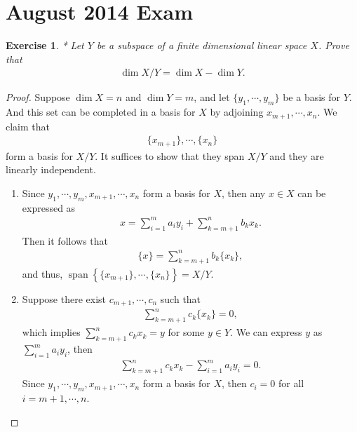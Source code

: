 \documentclass[11pt]{article}
\newtheorem{exercise}{Exercise}[section]
\theoremstyle{definition}
\numberwithin{equation}{subsection}
\begin{document}
\newpage
\section{August 2014 Exam}

\begin{exercise}{\rm \cite{10}*}
Let $Y$ be a subspace of a finite dimensional linear space $X$. Prove that
\begin{align*}
    \dim X/Y = \dim X - \dim Y.
\end{align*}
\end{exercise}
\begin{proof}
Suppose $\dim X = n$ and $\dim Y = m$, and let $\{y_1, \cdots, y_m\}$ be a basis for $Y$. And this set can be completed in a basis for $X$ by adjoining $x_{m+1}, \cdots, x_n$. We claim that
\begin{align*}
    \{x_{m+1}\}, \cdots, \{x_n\}
\end{align*}
form a basis for $X/Y$. It suffices to show that they span $X/Y$ and they are linearly independent.
\begin{enumerate}[label=(\alph*)]
    \item Since $y_1, \cdots, y_m, x_{m+1}, \cdots, x_n$ form a basis for $X$, then any $x \in X$ can be expressed as
    \begin{align*}
        x = \sum^m_{i=1} a_i y_i + \sum^n_{k=m+1} b_k x_k.
    \end{align*}
    Then it follows that
    \begin{align*}
        \{x\} = \sum^n_{k=m+1} b_k \{x_k\},
    \end{align*}
    and thus, $\operatorname{span} \left\{ \{x_{m+1}\}, \cdots, \{x_n\} \right\} = X/Y$.
    
    \item Suppose there exist $c_{m+1}, \cdots, c_n$ such that
    \begin{align*}
        \sum^n_{k=m+1} c_k \{x_k\} = 0,
    \end{align*}
    which implies $\sum^n_{k=m+1} c_k x_k = y$ for some $y \in Y$. We can express $y$ as $\sum^m_{i=1} a_i y_i$, then 
    \begin{align*}
        \sum^n_{k=m+1} c_k x_k - \sum^m_{i=1} a_i y_i = 0.
    \end{align*}
    Since $y_1, \cdots, y_m, x_{m+1}, \cdots, x_n$ form a basis for $X$, then $c_i = 0$ for all $i = m+1, \cdots, n$.
\end{enumerate}
\end{proof}
\end{document}
